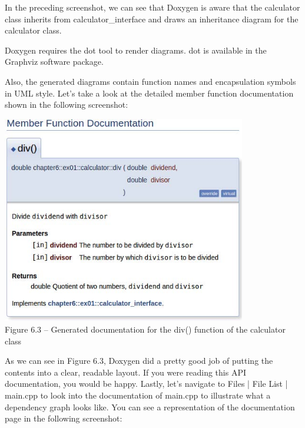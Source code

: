 In the preceding screenshot, we can see that Doxygen is aware that the calculator class inherits from calculator\_interface and draws an inheritance diagram for the calculator class.

\begin{tcolorbox}[colback=webgreen!5!white,colframe=webgreen!75!black,title=Note]
Doxygen requires the dot tool to render diagrams. dot is available in the Graphviz software package.
\end{tcolorbox}

Also, the generated diagrams contain function names and encapsulation symbols in UML style. Let's take a look at the detailed member function documentation shown in the following screenshot:

\begin{center}
\includegraphics[width=0.8\textwidth]{content/2/chapter6/images/3.jpg}\\
Figure 6.3 – Generated documentation for the div() function of the calculator class
\end{center}

As we can see in Figure 6.3, Doxygen did a pretty good job of putting the contents into a clear, readable layout. If you were reading this API documentation, you would be happy. Lastly, let's navigate to Files | File List | main.cpp to look into the documentation of main.cpp to illustrate what a dependency graph looks like. You can see a representation of the documentation page in the following screenshot:


